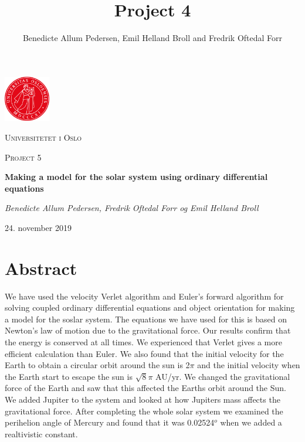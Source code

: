 \documentclass{article}
\title{Project 4}\vspace{-3ex}
\author{Benedicte Allum Pedersen, Emil Helland Broll and Fredrik Oftedal Forr}
\date{\vspace{-5ex}}
\begin{document}
\begin{titlepage}
  \centering
  \includegraphics[width=0.15\textwidth]{./pics/uio.png}\par\vspace{1cm}
  {\scshape\LARGE Universitetet i Oslo\par}
  \vspace{1cm}
  {\scshape\Large Project 5\par}
  \vspace{1.5cm}
  {\huge\bfseries Making a model for the solar system using ordinary differential equations\par}
  \vspace{2cm}
  {\Large\itshape Benedicte Allum Pedersen, Fredrik Oftedal Forr og Emil Helland Broll\par}
	\vfill

  \vfill
  {\large 24. november 2019\par}
\end{titlepage}

\section*{Abstract}
We have used the velocity Verlet algorithm and Euler's forward algorithm for solving coupled ordinary differential equations and object orientation for making a model for the soslar system. The equations we have used for this is based on Newton's law of motion due to the gravitational force. Our results confirm that the energy is conserved at all times. We experienced that Verlet gives a more efficient calculation than Euler. We also found that the initial velocity for the Earth to obtain a circular orbit around the sun is 2$\pi$ and the initial velocity when the Earth start to escape the sun is $\sqrt{8}\pi$ AU/yr. We changed the gravitational force of the Earth and saw that this affected the Earths orbit around the Sun. We added Jupiter to the system and looked at how Jupiters mass affects the gravitational force. After completing the whole solar system we examined the perihelion angle of Mercury and found that it was 0.02524$^o$ when we added a realtivistic constant. 

\tableofcontents

\newpage
\end{document}
